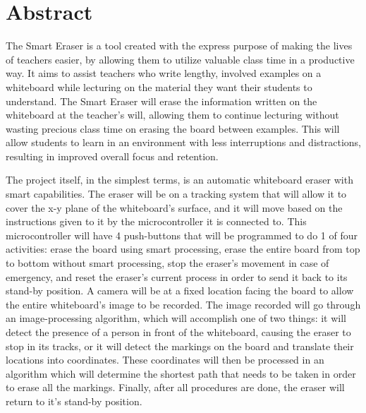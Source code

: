  \section*{Abstract}

 The Smart Eraser is a tool created with the express purpose of making the lives of teachers easier, by allowing them to utilize valuable class time in a productive way. It aims to assist teachers who write lengthy, involved examples on a whiteboard while lecturing on the material they want their students to understand. The Smart Eraser will erase the information written on the whiteboard at the teacher's will, allowing them to continue lecturing without wasting precious class time on erasing the board between examples. This will allow students to learn in an environment with less interruptions and distractions, resulting in improved overall focus and retention. \par
 \setlength{\parindent}{2.5ex} The project itself, in the simplest terms, is an automatic whiteboard eraser with smart capabilities. The eraser will be on a tracking system that will allow it to cover the x-y plane of the whiteboard's surface, and it will move based on the instructions given to it by the microcontroller it is connected to. This microcontroller will have 4 push-buttons that will be programmed to do 1 of four activities: erase the board using smart processing, erase the entire board from top to bottom without smart processing, stop the eraser's movement in case of emergency, and reset the eraser’s current process in order to send it back to its stand-by position. A camera will be at a fixed location facing the board to allow the entire whiteboard's image to be recorded. The image recorded will go through an image-processing algorithm, which will accomplish one of two things: it will detect the presence of a person in front of the whiteboard, causing the eraser to stop in its tracks, or it will detect the markings on the board and translate their locations into coordinates. These coordinates will then be processed in an algorithm which will determine the shortest path that needs to be taken in order to erase all the markings. Finally, after all procedures are done, the eraser will return to it's stand-by position.
 
\newpage
\setcounter{page}{1}
